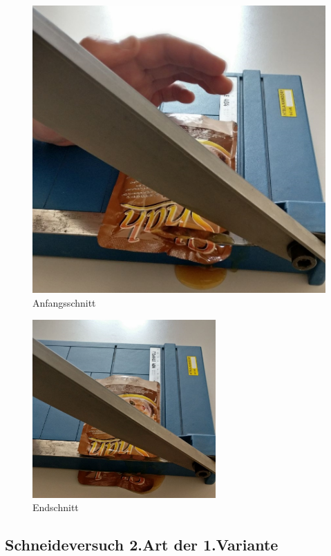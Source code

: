 \begin{figure}[H]
\begin{minipage}[hbt]{.5\linewidth}
      \includegraphics[width=\linewidth]{Bilder/Schneideversuch_1.Art/Anfangsschnitt}
      \caption{Anfangsschnitt}
      \label{Anfangsschnitt} 
   \end{minipage}
\end{figure}

\begin{figure}[H]
\begin{center}
\includegraphics[width=7cm]{Bilder/Schneideversuch_1.Art/Endschnitt}
\caption{Endschnitt}
\label{Endschnitt} 
\end{center}
\end{figure}
\newpage
\subsection{Schneideversuch 2.Art der 1.Variante}

